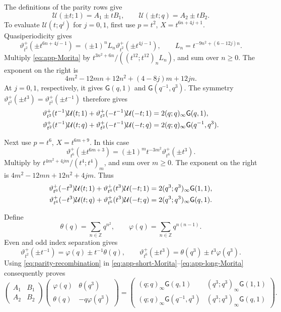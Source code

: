 \documentclass[11pt]{article}
\numberwithin{equation}{section}
\theoremstyle{remark}
\begin{document}
The definitions of the parity rows give
\begin{equation}\label{eq:parity-recombination}
 \mathcal U(\pm t;1)=A_1\pm tB_1,\qquad
 \mathcal U(\pm t;q)=A_2\pm tB_2.
\end{equation}
To evaluate \(\mathcal U(t;q^j)\) for \(j=0,1\), first use
\(p=t^2\), \(X=t^{6n+4j+1}\).
Quasiperiodicity gives
\[
 \vartheta_{t^2}^{+}(\pm t^{6n+4j-1})
       =(\pm1)^n L_n\vartheta_{t^2}^{+}(\pm t^{4j-1}),
 \qquad L_n=t^{-9n^2+(6-12j)n}.
\]
Multiply \eqref{eq:app-Morita} by
\(t^{3n^2+6n}/((t^{12};t^{12})_n L_n)\), and sum over \(n\geq0\).
The exponent on the right is
\[
 4m^2-12mn+12n^2+(4-8j)m+12jn.
\]
At \(j=0,1\), respectively, it gives
\(\mathsf G(q,1)\) and \(\mathsf G(q^{-1},q^3)\).
The symmetry
\(\vartheta_{t^2}^{+}(\pm t^3)
 =\vartheta_{t^2}^{+}(\pm t^{-1})\) therefore gives
\begin{align}
 \vartheta_{t^2}^{+}(t^{-1})\mathcal U(t;1)
 +\vartheta_{t^2}^{+}(-t^{-1})\mathcal U(-t;1)
       &=2(q;q)_\infty\mathsf G(q,1),\notag\\
 \vartheta_{t^2}^{+}(t^{-1})\mathcal U(t;q)
 +\vartheta_{t^2}^{+}(-t^{-1})\mathcal U(-t;q)
       &=2(q;q)_\infty\mathsf G(q^{-1},q^3).
       \label{eq:app-short-Morita}
\end{align}

Next use \(p=t^6\), \(X=t^{6m+9}\).  In this case
\[
 \vartheta_{t^6}^{+}(\pm t^{6m+3})
       =(\pm1)^m t^{-3m^2}\vartheta_{t^6}^{+}(\pm t^3).
\]
Multiply by \(t^{4m^2+4jm}/(t^4;t^4)_m\), and sum over \(m\geq0\).
The exponent on the right is
\(4m^2-12mn+12n^2+4jm\).  Thus
\begin{align}
 \vartheta_{t^6}^{+}(-t^3)\mathcal U(t;1)
 +\vartheta_{t^6}^{+}(t^3)\mathcal U(-t;1)
       &=2(q^3;q^3)_\infty\mathsf G(1,1),\notag\\
 \vartheta_{t^6}^{+}(-t^3)\mathcal U(t;q)
 +\vartheta_{t^6}^{+}(t^3)\mathcal U(-t;q)
       &=2(q^3;q^3)_\infty\mathsf G(q,1).
       \label{eq:app-long-Morita}
\end{align}

Define
\[
 \theta(q)=\sum_{n\in\mathbb Z}q^{n^2},\qquad
 \varphi(q)=\sum_{n\in\mathbb Z}q^{n(n-1)}.
\]
Even and odd index separation gives
\[
 \vartheta_{t^2}^{+}(\pm t^{-1})
       =\varphi(q)\pm t^{-1}\theta(q),\qquad
 \vartheta_{t^6}^{+}(\pm t^3)
       =\theta(q^3)\pm t^3\varphi(q^3).
\]
Using \eqref{eq:parity-recombination} in
\eqref{eq:app-short-Morita}--\eqref{eq:app-long-Morita} consequently
proves
\begin{equation}\label{eq:app-source-matrix}
 \begin{pmatrix}A_1&B_1\\A_2&B_2\end{pmatrix}
 \begin{pmatrix}\varphi(q)&\theta(q^3)\\
                 \theta(q)&-q\varphi(q^3)\end{pmatrix}
 =\begin{pmatrix}
 (q;q)_\infty\mathsf G(q,1)&(q^3;q^3)_\infty\mathsf G(1,1)\\
 (q;q)_\infty\mathsf G(q^{-1},q^3)&(q^3;q^3)_\infty\mathsf G(q,1)
 \end{pmatrix}.
\end{equation}
\end{document}
